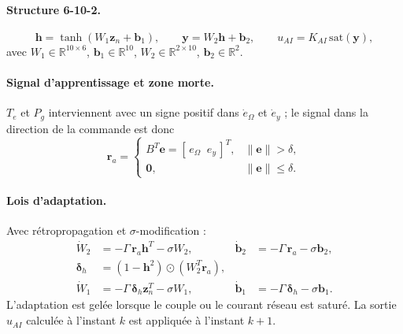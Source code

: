 \documentclass[11pt,a4paper]{article}
\theoremstyle{remark}
\newcommand{\vect}[1]{\bm{#1}}
\begin{document}
\paragraph{Structure 6-10-2.}
\begin{equation}
  \vect{h} = \tanh(W_1\vect{z}_n + \vect{b}_1), \qquad
  \vect{y} = W_2\vect{h} + \vect{b}_2, \qquad
  u_{AI} = K_{AI}\,\mathrm{sat}(\vect{y}),
\end{equation}
avec $W_1\in\mathbb{R}^{10\times6}$, $\vect{b}_1\in\mathbb{R}^{10}$, $W_2\in\mathbb{R}^{2\times10}$,
$\vect{b}_2\in\mathbb{R}^{2}$.

\paragraph{Signal d'apprentissage et zone morte.} $T_e$ et $P_g$ interviennent avec un signe positif
dans $\dot e_\Omega$ et $\dot e_y$ ; le signal dans la direction de la commande est donc
\begin{equation}
  \vect{r}_a = \begin{cases} B^T\vect{e} = [\,e_\Omega\;\; e_y\,]^T, & \|\vect{e}\| > \delta,\\
  \vect{0}, & \|\vect{e}\|\le\delta. \end{cases}
\end{equation}

\paragraph{Lois d'adaptation.} Avec rétropropagation et $\sigma$-modification :
\begin{align}
  \dot W_2 &= -\Gamma\,\vect{r}_a\vect{h}^T - \sigma W_2, &
  \dot{\vect{b}}_2 &= -\Gamma\,\vect{r}_a - \sigma\vect{b}_2,\\
  \boldsymbol{\delta}_h &= (1-\vect{h}^2)\odot(W_2^T\vect{r}_a), &&\\
  \dot W_1 &= -\Gamma\,\boldsymbol{\delta}_h\vect{z}_n^T - \sigma W_1, &
  \dot{\vect{b}}_1 &= -\Gamma\,\boldsymbol{\delta}_h - \sigma\vect{b}_1 .
\end{align}
L'adaptation est gelée lorsque le couple ou le courant réseau est saturé. La sortie $u_{AI}$
calculée à l'instant $k$ est appliquée à l'instant $k+1$.
\end{document}
